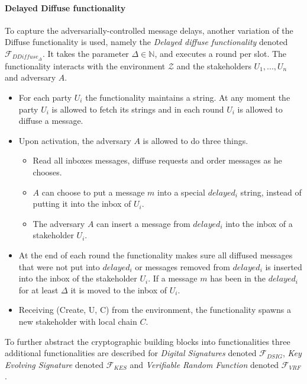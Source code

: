 \paragraph{Delayed Diffuse functionality} To capture the adversarially-controlled message delays, another variation of the Diffuse functionality is used, namely the \emph{Delayed diffuse functionality} denoted $\mathcal{F}_{DDiffuse_{\Delta}}$. It takes the parameter $\Delta \in \mathbb{N}$, and executes a round per slot. The functionality interacts with the environment $\mathcal{Z}$ and the stakeholders $U_1, ..., U_n$ and adversary $A$.
\begin{itemize}
    \item For each party $U_i$ the functionality maintains a string. At any moment the party $U_i$ is allowed to fetch its strings and in each round $U_i$ is allowed to diffuse a message.
    \item Upon activation, the adversary $A$ is allowed to do three things.
    \begin{itemize}
        \item Read all inboxes messages, diffuse requests and order messages as he chooses.
        \item $A$ can choose to put a message $m$ into a special $delayed_i$ string, instead of putting it into the inbox of $U_i$.
        \item The adversary $A$ can insert a message from $delayed_i$ into the inbox of a stakeholder $U_i$.
    \end{itemize}
    \item At the end of each round the functionality makes sure all diffused messages that were not put into $delayed_i$ or messages removed from $delayed_i$ is inserted into the inbox of the stakeholder $U_i$. If a message $m$ has been in the $delayed_i$ for at least $\Delta$ it is moved to the inbox of $U_i$.
    \item Receiving (Create, U, C) from the environment, the functionality spawns a new stakeholder with local chain $C$.
\end{itemize}

To further abstract the cryptographic building blocks into functionalities three additional functionalities are described for \emph{Digital Signatures} denoted $\mathcal{F}_{DSIG}$, \emph{Key Evolving Signature} denoted $\mathcal{F}_{KES}$ and \emph{Verifiable Random Function} denoted $\mathcal{F}_{VRF}$.

